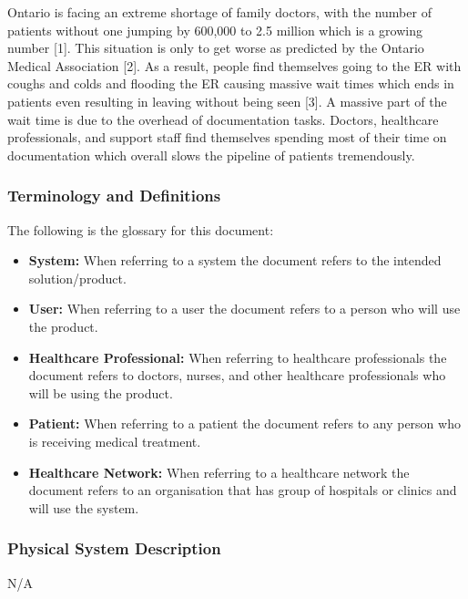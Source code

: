 \documentclass[12pt]{article}
\begin{document}
Ontario is facing an extreme shortage of family doctors, with the number of patients without one jumping by 600,000 to 2.5 million which is a growing number [1]. This situation is only to get worse as predicted by the Ontario Medical Association [2]. As a result, people find themselves going to the ER with coughs and colds and flooding the ER causing massive wait times which ends in patients even resulting in leaving without being seen [3]. A massive part of the wait time is due to the overhead of documentation tasks. Doctors, healthcare professionals, and support staff find themselves spending most of their time on documentation which overall slows the pipeline of patients tremendously.


\subsubsection{Terminology and Definitions} \label{sec_TerminologyDefinitions}

The following is the glossary for this document:

\begin{itemize}
  \item \textbf{System:} When referring to a system the document refers to the intended solution/product.
  \item \textbf{User:} When referring to a user the document refers to a person who will use the product.
  \item \textbf{Healthcare Professional:} When referring to healthcare professionals the document refers to doctors, nurses, and other healthcare professionals who will be using the product.
  \item \textbf{Patient:} When referring to a patient the document refers to any person who is receiving medical treatment.
  \item \textbf{Healthcare Network:} When referring to a healthcare network the document refers to an organisation that has group of hospitals or clinics and will use the system.

\end{itemize}


\subsubsection{Physical System Description} \label{sec_phySystDescrip}
N/A
\end{document}

